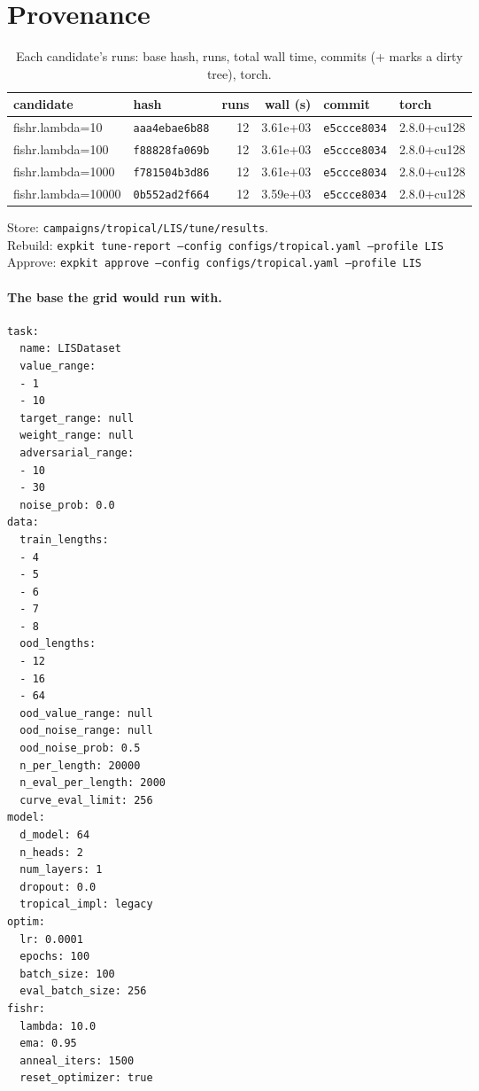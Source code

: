\documentclass[10pt]{article}
\begin{document}
\section{Provenance}
{\small
\begin{longtable}{llrrll}
\caption{Each candidate's runs: base hash, runs, total wall time, commits (+ marks a dirty tree), torch.}\label{tab:provenance}\\
\toprule
candidate & hash & runs & wall (s) & commit & torch\\
\midrule
\endhead
fishr.lambda=10 & \texttt{aaa4ebae6b88} & 12 & 3.61e+03 & \texttt{e5ccce8034} & 2.8.0+cu128\\
fishr.lambda=100 & \texttt{f88828fa069b} & 12 & 3.61e+03 & \texttt{e5ccce8034} & 2.8.0+cu128\\
fishr.lambda=1000 & \texttt{f781504b3d86} & 12 & 3.61e+03 & \texttt{e5ccce8034} & 2.8.0+cu128\\
fishr.lambda=10000 & \texttt{0b552ad2f664} & 12 & 3.59e+03 & \texttt{e5ccce8034} & 2.8.0+cu128\\
\bottomrule
\end{longtable}
}
\noindent Store: \texttt{campaigns/tropical/LIS/tune/results}.\\
Rebuild: \texttt{expkit tune-report --config configs/tropical.yaml --profile LIS}\\
Approve: \texttt{expkit approve --config configs/tropical.yaml --profile LIS}

\paragraph{The base the grid would run with.}
{\footnotesize
\begin{verbatim}
task:
  name: LISDataset
  value_range:
  - 1
  - 10
  target_range: null
  weight_range: null
  adversarial_range:
  - 10
  - 30
  noise_prob: 0.0
data:
  train_lengths:
  - 4
  - 5
  - 6
  - 7
  - 8
  ood_lengths:
  - 12
  - 16
  - 64
  ood_value_range: null
  ood_noise_range: null
  ood_noise_prob: 0.5
  n_per_length: 20000
  n_eval_per_length: 2000
  curve_eval_limit: 256
model:
  d_model: 64
  n_heads: 2
  num_layers: 1
  dropout: 0.0
  tropical_impl: legacy
optim:
  lr: 0.0001
  epochs: 100
  batch_size: 100
  eval_batch_size: 256
fishr:
  lambda: 10.0
  ema: 0.95
  anneal_iters: 1500
  reset_optimizer: true
\end{verbatim}
}

\clearpage
\appendix
\end{document}
